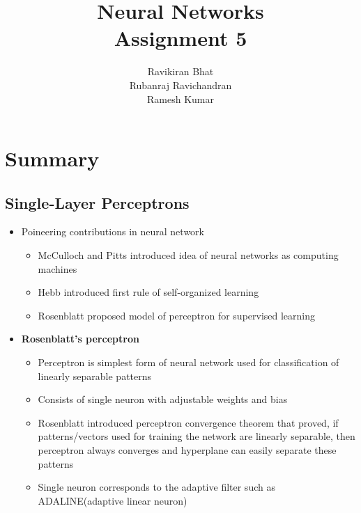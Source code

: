 \documentclass[12pt]{article}
\title{\Huge Neural Networks \\
[6mm]
Assignment 5\\}
\author{Ravikiran Bhat\\
Rubanraj Ravichandran\\
Ramesh Kumar}
\begin{document}
\maketitle
\newpage
\section{Summary}
 
\subsection{Single-Layer Perceptrons}

\begin{itemize}
	\item Poineering contributions in neural network
		\begin{itemize}
			\item McCulloch and Pitts introduced idea of neural networks as computing machines
			\item Hebb introduced first rule of self-organized learning
			\item Rosenblatt proposed model of perceptron for supervised learning
		\end{itemize}
	\item  \textbf{Rosenblatt's perceptron}
		\begin{itemize}
			\item Perceptron is simplest form of neural network used for classification of linearly separable patterns
			\item Consists of single neuron with adjustable weights and bias
			\item Rosenblatt introduced perceptron convergence theorem that proved, if patterns/vectors used for training the network are linearly separable, then perceptron always converges and hyperplane can easily separate these patterns
			\item Single neuron corresponds to the adaptive filter such as ADALINE(adaptive linear neuron)
		\end{itemize}
\end{itemize}
\end{document}

